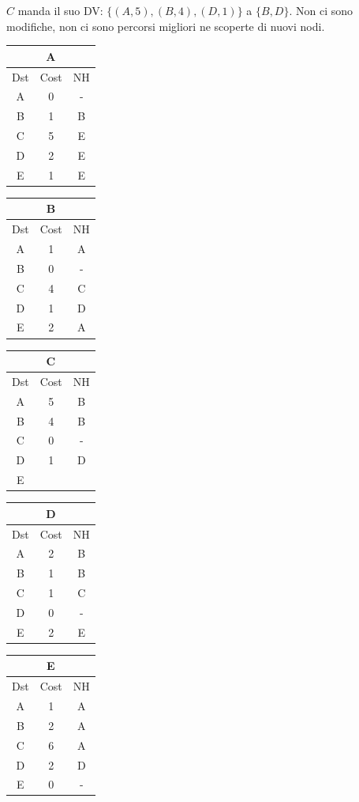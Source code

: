 \documentclass[10pt]{article}
\begin{document}
	\newline \newline
	$C$ manda il suo DV: $\{(A,5),(B,4),(D,1)\}$ a $\{B,D\}$.
	\newline
	Non ci sono modifiche, non ci sono percorsi migliori ne scoperte di nuovi nodi.
	\begin{table}[h!]
		\begin{tabular}{|c||c||c|}
 			\hline
	 		\multicolumn{3}{|c|}{A} \\
 			\hline
 			Dst & Cost & NH\\
 			\hline
 			A & 0 & - \\
 			B & 1 & B \\
 			C & 5 & E \\
 			D & 2 & E \\
 			E & 1 & E \\
 			\hline
		\end{tabular}
		\begin{tabular}{|c||c||c|}
 			\hline
	 		\multicolumn{3}{|c|}{B} \\
 			\hline
 			Dst & Cost & NH\\
 			\hline
 			A & 1 & A \\
 			B & 0 & - \\
 			C & 4 & C  \\
 			D & 1 & D \\
 			E & 2 & A \\
 			\hline
		\end{tabular}
		\begin{tabular}{|c||c||c|}
 			\hline
	 		\multicolumn{3}{|c|}{C} \\
 			\hline
 			Dst & Cost & NH\\
 			\hline
 			A & 5 & B \\
 			B & 4 & B \\
 			C & 0 & - \\
 			D & 1 & D \\
 			E &   &   \\
 			\hline
		\end{tabular}
		\begin{tabular}{|c||c||c|}
 			\hline
	 		\multicolumn{3}{|c|}{D} \\
 			\hline
 			Dst & Cost & NH\\
 			\hline
 			A & 2 & B \\
 			B & 1 & B \\
 			C & 1 & C \\
 			D & 0 & - \\
 			E & 2 & E \\
 			\hline
		\end{tabular}
		\begin{tabular}{|c||c||c|}
 			\hline
	 		\multicolumn{3}{|c|}{E} \\
 			\hline
 			Dst & Cost & NH\\
 			\hline
 			A & 1 & A \\
 			B & 2 & A \\
 			C & 6 & A \\
 			D & 2 & D \\
 			E & 0 & - \\
 			\hline
		\end{tabular}
	\end{table}
\end{document}

